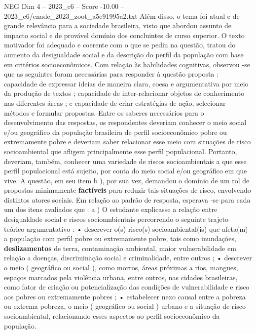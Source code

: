 \begin{textsample}{NEG Dim 4 – 2023\_c6 – Score -10.00 – 2023\_c6/enade\_2023\_zoot\_a5e91995a2.txt}
Além disso, o tema foi atual e de grande relevância para a sociedade brasileira, visto que abordou assunto de impacto social e de provável domínio dos concluintes de curso superior.
O texto motivador foi adequado e coerente com o que se pediu na questão, tratou do aumento da desigualdade social e da descrição do perfil da população com base em critérios socioeconômicos.
Com relação às habilidades cognitivas, observou -se que as seguintes foram necessárias para responder à questão proposta : capacidade de expressar ideias de maneira clara, coesa e argumentativa por meio da produção de textos ; capacidade de inter-relacionar objetos de conhecimento nas diferentes áreas ; e capacidade de criar estratégias de ação, selecionar métodos e formular propostas.
Entre os saberes necessários para o desenvolvimento das respostas, os respondentes deveriam conhecer o meio social e/ou geográfico da população brasileira de perfil socioeconômico pobre ou extremamente pobre e deveriam saber relacionar esse meio com situações de risco socioambiental que afligem principalmente esse perfil populacional.
Portanto, deveriam, também, conhecer uma variedade de riscos socioambientais a que esse perfil populacional está sujeito, por conta do meio social e/ou geográfico em que vive.
A questão, em seu item b ), por sua vez, demandou o domínio de um rol de propostas minimamente \textbf{factíveis} para reduzir tais situações de risco, envolvendo distintos atores sociais.
Em relação ao padrão de resposta, esperava -se para cada um dos itens avaliados que : a ) O estudante explicasse a relação entre desigualdade social e riscos socioambientais percorrendo o seguinte trajeto teórico-argumentativo : • descrever o(s) risco(s) socioambiental(is) que afeta(m) a população com perfil pobre ou extremamente pobre, tais como inundações, \textbf{deslizamentos} de terra, contaminação ambiental, maior vulnerabilidade em relação a doenças, discriminação social e criminalidade, entre outros ; • descrever o meio ( geográfico ou social ), como morros, áreas próximas a rios, mangues, espaços marcados pela violência urbana, entre outros, nas cidades brasileiras, como fator de criação ou potencialização das condições de vulnerabilidade e risco aos pobres ou extremamente pobres ; • estabelecer nexo causal entre a pobreza ou extrema pobreza, o meio ( geográfico ou social ) urbano e a situação de risco socioambiental, relacionando esses aspectos ao perfil socioeconômico da população.

\end{textsample}
